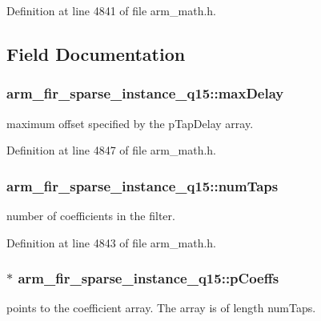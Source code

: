 Definition at line 4841 of file arm\-\_\-math.\-h.



\subsection{Field Documentation}
\hypertarget{structarm__fir__sparse__instance__q15_ad14cc1070eecf7e1926d8f67a8273182}{
\subsubsection[{max\-Delay}]{ arm\-\_\-fir\-\_\-sparse\-\_\-instance\-\_\-q15\-::max\-Delay}}\label{structarm__fir__sparse__instance__q15_ad14cc1070eecf7e1926d8f67a8273182}
maximum offset specified by the p\-Tap\-Delay array. 

Definition at line 4847 of file arm\-\_\-math.\-h.

\hypertarget{structarm__fir__sparse__instance__q15_a0f66b126dd8b85f7467cfb01b7bc4d77}{
\subsubsection[{num\-Taps}]{ arm\-\_\-fir\-\_\-sparse\-\_\-instance\-\_\-q15\-::num\-Taps}}\label{structarm__fir__sparse__instance__q15_a0f66b126dd8b85f7467cfb01b7bc4d77}
number of coefficients in the filter. 

Definition at line 4843 of file arm\-\_\-math.\-h.

\hypertarget{structarm__fir__sparse__instance__q15_a78a6565473b5f0b8c77c3f0f58a76069}{
\subsubsection[{p\-Coeffs}]{$\ast$ arm\-\_\-fir\-\_\-sparse\-\_\-instance\-\_\-q15\-::p\-Coeffs}}\label{structarm__fir__sparse__instance__q15_a78a6565473b5f0b8c77c3f0f58a76069}
points to the coefficient array. The array is of length num\-Taps. 

